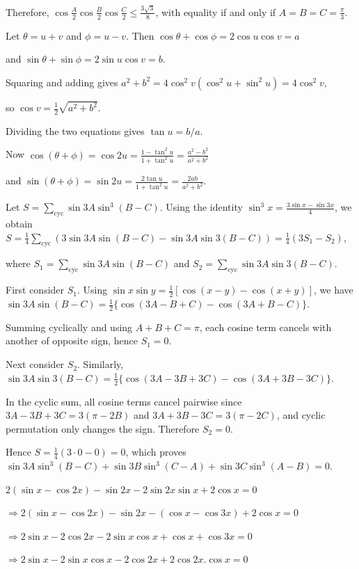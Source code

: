   Therefore, $\cos\frac{A}{2} \cos\frac{B}{2} \cos\frac{C}{2} \le \frac{3\sqrt{3}}{8}$, with equality if and
  only if $A = B = C = \frac{\pi}{3}$.
\item Let $\theta = u + v$ and $\phi = u - v$. Then $\cos\theta + \cos\phi = 2\cos u\cos v = a$

  and $\sin\theta + \sin\phi = 2\sin u\cos v = b$.

  Squaring and adding gives $a^2 + b^2 = 4\cos^2v(\cos^2u+\sin^2u) = 4\cos^2v$,

  so $\cos v = \tfrac12\sqrt{a^2+b^2}$.

  Dividing the two equations gives $\tan u=b/a$.

  Now $\cos(\theta + \phi) = \cos2u = \frac{1 - \tan^2u}{1 + \tan^2u} = \frac{a^2 - b^2}{a^2 + b^2}$

  and $\sin(\theta + \phi) = \sin2u = \frac{2\tan u}{1 + \tan^2u}=\frac{2ab}{a^2 + b^2}$.
\item Let $S=\sum_{\text{cyc}}\sin3A\sin^3(B-C)$.
  Using the identity $\sin^3x=\frac{3\sin x-\sin3x}{4}$, we obtain
  $S=\frac14\sum_{\text{cyc}}\left(3\sin3A\sin(B-C)-\sin3A\sin3(B-C)\right)
  =\frac14(3S_1-S_2)$,

  where $S_1=\sum_{\text{cyc}}\sin3A\sin(B-C)$ and $S_2=\sum_{\text{cyc}}\sin3A\sin3(B-C)$.

  First consider $S_1$. Using $\sin x\sin y=\frac12[\cos(x-y)-\cos(x+y)]$, we have
  $\sin3A\sin(B-C)=\frac12\{\cos(3A-B+C)-\cos(3A+B-C)\}$.

  Summing cyclically and using $A+B+C=\pi$, each cosine term cancels with another of opposite sign, hence
  $S_1=0$.

  Next consider $S_2$. Similarly, $\sin3A\sin3(B-C)=\frac12\{\cos(3A-3B+3C)-\cos(3A+3B-3C)\}$.

  In the cyclic sum, all cosine terms cancel pairwise since
  $3A-3B+3C=3(\pi-2B)$ and $3A+3B-3C=3(\pi-2C)$, and cyclic permutation only changes the sign.
  Therefore $S_2=0$.

  Hence $S=\frac14(3\cdot0-0)=0$, which proves
  $\sin3A\sin^3(B-C)+\sin3B\sin^3(C-A)+\sin3C\sin^3(A-B)=0$.
\item $2(\sin x - \cos2x) - \sin2x - 2\sin2x\sin x + 2\cos x = 0$

  $\Rightarrow 2(\sin x - \cos2x) - \sin2x - (\cos x - \cos3x) + 2\cos x = 0$

  $\Rightarrow 2\sin x - 2\cos2x - 2\sin x\cos x + \cos x + \cos 3x = 0$

  $\Rightarrow 2\sin x - 2\sin x\cos x - 2\cos2x + 2\cos2x.\cos x = 0$

